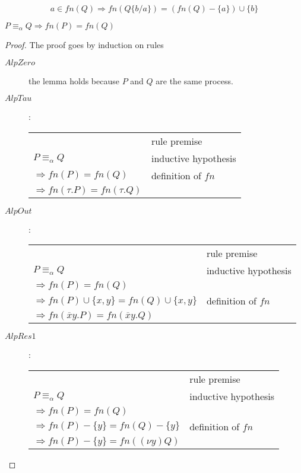 \begin{lemma}\label{freenamesandsubstitution}
  \[
    a\in fn(Q)\Rightarrow fn(Q\{b/a\})=(fn(Q)-\{a\}) \cup \{b\}
  \]
\end{lemma}

\begin{lemma}\label{alphaequivalentsamefreenames}
  $P\equiv_{\alpha}Q\Rightarrow fn(P)=fn(Q)$
  \begin{proof}
    The proof goes by induction on rules 
    \begin{description}
      \item[$AlpZero$]
	the lemma holds because $P$ and $Q$ are the same process.
      \item[$AlpTau$]:
	\begin{center}
	  \begin{tabular}{ll}
	    &rule premise\\
	    $P\equiv_{\alpha}Q$&inductive hypothesis\\
	    $\Rightarrow fn(P)=fn(Q)$&definition of $fn$\\
	    $\Rightarrow fn(\tau.P)=fn(\tau.Q)$&\\
	  \end{tabular}
	\end{center}
      \item[$AlpOut$]:
	\begin{center}
	  \begin{tabular}{ll}
	    &rule premise\\
	    $P\equiv_{\alpha}Q$&inductive hypothesis\\
	    $\Rightarrow fn(P)=fn(Q)$&\\
	    $\Rightarrow fn(P)\cup \{x,y\}=fn(Q)\cup \{x,y\}$&definition of $fn$\\
	    $\Rightarrow fn(\overline{x}y.P)=fn(\overline{x}y.Q)$&\\
	  \end{tabular}
	\end{center}
      \item[$AlpRes1$]:
	\begin{center}
	  \begin{tabular}{ll}
	    &rule premise\\
	    $P\equiv_{\alpha}Q$&inductive hypothesis\\
	    $\Rightarrow fn(P)=fn(Q)$&\\
	    $\Rightarrow fn(P)-\{y\}=fn(Q)- \{y\}$&definition of $fn$\\
	    $\Rightarrow fn(P)-\{y\}=fn((\nu y)Q)$&\\

\end{tabular}
\end{center}
\end{description}
\end{proof}
\end{lemma}
